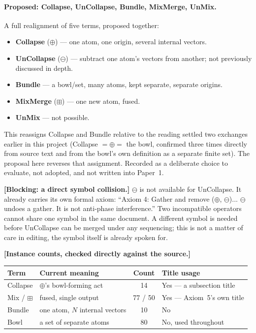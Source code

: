 \documentclass[11pt]{article}
\begin{document}
\paragraph{Proposed: Collapse, UnCollapse, Bundle, MixMerge, UnMix.}
A full realignment of five terms, proposed together:
\begin{itemize}
\item \textbf{Collapse} ($\oplus$) --- one atom, one origin, several
      internal vectors.
\item \textbf{UnCollapse} ($\ominus$) --- subtract one atom's vectors
      from another; not previously discussed in depth.
\item \textbf{Bundle} --- a bowl/set, many atoms, kept separate,
      separate origins.
\item \textbf{MixMerge} ($\boxplus$) --- one new atom, fused.
\item \textbf{UnMix} --- not possible.
\end{itemize}
This reassigns Collapse and Bundle relative to the reading settled
two exchanges earlier in this project (Collapse $=\oplus=$ the bowl,
confirmed three times directly from source text and from the bowl's
own definition as a separate finite set). The proposal here reverses
that assignment. Recorded as a deliberate choice to evaluate, not
adopted, and not written into Paper~1.

\textbf{[Blocking: a direct symbol collision.]} $\ominus$ is not
available for UnCollapse. It already carries its own formal axiom:
``Axiom 4: Gather and remove ($\oplus$, $\ominus$)... $\ominus$
undoes a gather. It is not anti-phase interference.'' Two
incompatible operators cannot share one symbol in the same document.
A different symbol is needed before UnCollapse can be merged under
any sequencing; this is not a matter of care in editing, the symbol
itself is already spoken for.

\textbf{[Instance counts, checked directly against the source.]}
\begin{center}
\begin{tabular}{llcl}
Term & Current meaning & Count & Title usage \\
\hline
Collapse & $\oplus$'s bowl-forming act & 14 & Yes --- a subsection
title \\
Mix / $\boxplus$ & fused, single output & 77 / 50 & Yes --- Axiom~5's
own title \\
Bundle & one atom, $N$ internal vectors & 10 & No \\
Bowl & a set of separate atoms & 80 & No, used throughout \\
\end{tabular}
\end{center}
\end{document}
